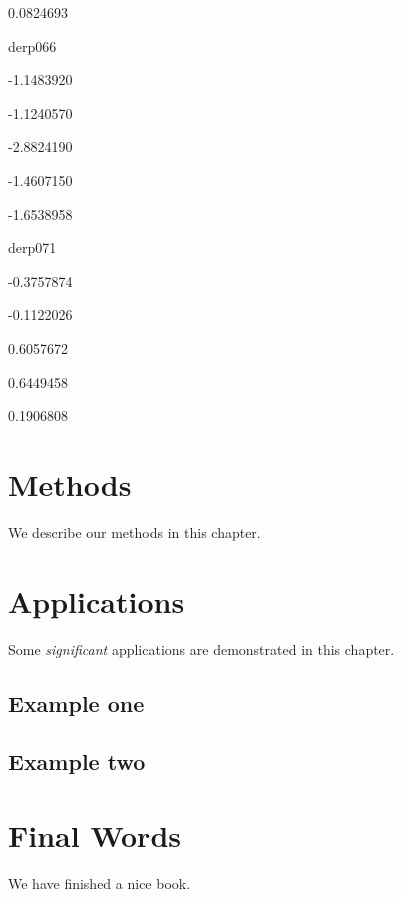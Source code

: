 \documentclass[]{book}
\begin{document}
0.0824693

derp066

-1.1483920

-1.1240570

-2.8824190

-1.4607150

-1.6538958

derp071

-0.3757874

-0.1122026

0.6057672

0.6449458

0.1906808

\chapter{Methods}\label{methods}

We describe our methods in this chapter.

\chapter{Applications}\label{applications}

Some \emph{significant} applications are demonstrated in this chapter.

\section{Example one}\label{example-one}

\section{Example two}\label{example-two}

\chapter{Final Words}\label{final-words}

We have finished a nice book.


\end{document}
